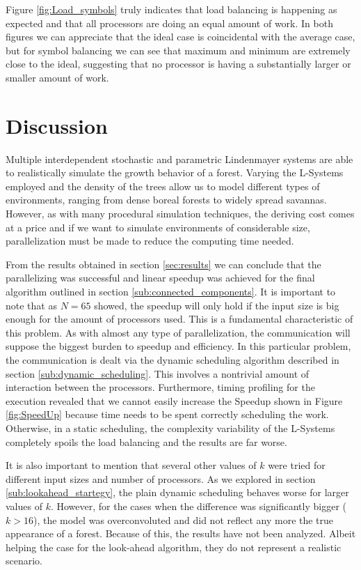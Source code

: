 \documentclass[letterpaper,twoside,11pt]{article}
\begin{document}
\begin{multicols}{2}
Figure \ref{fig:Load_symbols} truly indicates that load balancing is happening as expected and that all processors are doing an equal amount of work. In both figures we can appreciate that the ideal case is coincidental with the average case, but for symbol balancing we can see that maximum and minimum are extremely close to the ideal, suggesting that no processor is having a substantially larger or smaller amount of work.



\section{Discussion} %
\label{sec:discussion}

Multiple interdependent stochastic and parametric Lindenmayer systems are able to realistically simulate the growth behavior of a forest. Varying the L-Systems employed and the density of the trees allow us to model different types of environments, ranging from dense boreal forests to widely spread savannas. However, as with many procedural simulation techniques, the deriving cost comes at a price and if we want to simulate environments of considerable size, parallelization must be made to reduce the computing time needed.

From the results obtained in section \ref{sec:results} we can conclude that the parallelizing was successful and linear speedup was achieved for the final algorithm outlined in section \ref{sub:connected_components}. It is important to note that as $N = 65$ showed, the speedup will only hold if the input size is big enough for the amount of processors used. This is a fundamental characteristic of this problem. As with almost any type of parallelization, the communication will suppose the biggest burden to speedup and efficiency. In this particular problem, the communication is dealt via the dynamic scheduling algorithm described in section \ref{sub:dynamic_scheduling}. This involves a nontrivial amount of interaction between the processors. Furthermore, timing profiling for the execution revealed that we cannot easily increase the Speedup shown in Figure \ref{fig:SpeedUp} because time needs to be spent correctly scheduling the work. Otherwise, in a static scheduling, the complexity variability of the L-Systems completely spoils the load balancing and the results are far worse.

It is also important to mention that several other values of $k$ were tried for different input sizes and number of processors. As we explored in section \ref{sub:lookahead_startegy}, the plain dynamic scheduling behaves worse for larger values of $k$. However, for the cases when the difference was significantly bigger ($k > 16$), the model was overconvoluted and did not reflect any more the true appearance of a forest. Because of this, the results have not been analyzed. Albeit helping the case for the look-ahead algorithm, they do not represent a realistic scenario.


\end{multicols}
\end{document}
